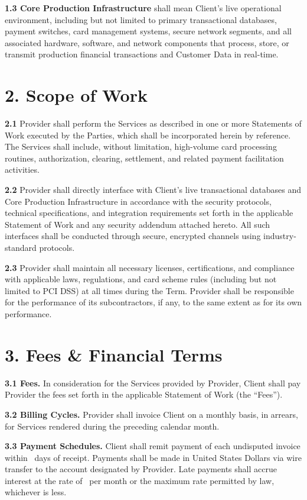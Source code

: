 \documentclass[11pt]{article}
\begin{document}
\textbf{1.3 Core Production Infrastructure} shall mean Client's live operational
environment, including but not limited to primary transactional databases, payment
switches, card management systems, secure network segments, and all associated hardware,
software, and network components that process, store, or transmit production financial
transactions and Customer Data in real-time.

\section*{2. Scope of Work}
\textbf{2.1} Provider shall perform the Services as described in one or more Statements of
Work executed by the Parties, which shall be incorporated herein by reference. The Services
shall include, without limitation, high-volume card processing routines, authorization,
clearing, settlement, and related payment facilitation activities.

\textbf{2.2} Provider shall directly interface with Client's live transactional databases
and Core Production Infrastructure in accordance with the security protocols, technical
specifications, and integration requirements set forth in the applicable Statement of Work
and any security addendum attached hereto. All such interfaces shall be conducted through
secure, encrypted channels using industry-standard protocols.

\textbf{2.3} Provider shall maintain all necessary licenses, certifications, and compliance
with applicable laws, regulations, and card scheme rules (including but not limited to PCI
DSS) at all times during the Term. Provider shall be responsible for the performance of its
subcontractors, if any, to the same extent as for its own performance.

\section*{3. Fees \& Financial Terms}
\textbf{3.1 Fees.} In consideration for the Services provided by Provider, Client shall pay
Provider the fees set forth in the applicable Statement of Work (the ``Fees'').

\textbf{3.2 Billing Cycles.} Provider shall invoice Client on a monthly basis, in arrears,
for Services rendered during the preceding calendar month.

\textbf{3.3 Payment Schedules.} Client shall remit payment of each undisputed invoice within
\PaymentTermDays\ days of receipt. Payments shall be made in United States Dollars via wire
transfer to the account designated by Provider. Late payments shall accrue interest at the
rate of \LatePaymentRate\ per month or the maximum rate permitted by law, whichever is less.
\end{document}
